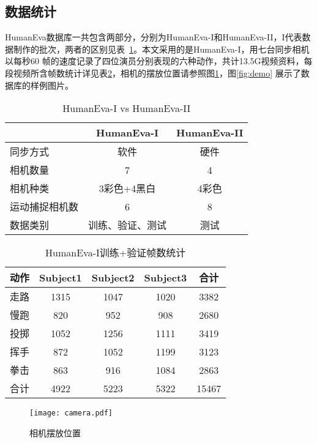 \subsection{数据统计}
HumanEva数据库一共包含两部分，分别为HumanEva-I和HumanEva-II，I代表数据制作的批次，两者的区别见表~\ref{tab:I-II}。本文采用的是HumanEva-I，用七台同步相机以每秒60 帧的速度记录了四位演员分别表现的六种动作，共计13.5G视频资料，每段视频所含帧数统计详见表\ref{tab:totalframes}，相机的摆放位置请参照图\ref{fig:camera}，图\ref{fig:demo} 展示了数据库的样例图片。
\begin{table}[htbp]
  \centering
  \caption{HumanEva-I vs HumanEva-II}
  \label{tab:I-II}
    \begin{tabular}{lcc}
      \toprule[1.5pt]
       & HumanEva-I & HumanEva-II \\\midrule[1pt]
      同步方式 & 软件 & 硬件\\
      相机数量 & 7 & 4\\
      相机种类 & 3彩色+4黑白 & 4彩色\\
      运动捕捉相机数 & 6 & 8\\
      数据类别 & 训练、验证、测试 & 测试\\
      \bottomrule[1.5pt]
    \end{tabular}
\end{table}

\begin{table}[htbp]
  \centering
  \caption{HumanEva-I训练+验证帧数统计}
  \label{tab:totalframes}
    \begin{tabular}{lcccc}
      \toprule[1.5pt]
      动作 & Subject1 & Subject2 & Subject3 & 合计 \\\midrule[1pt]
      走路 & 1315 & 1047 & 1020 & 3382 \\
      慢跑 & 820 & 952 & 908 & 2680 \\
      投掷 & 1052 & 1256 & 1111 & 3419 \\
      挥手 & 872 & 1052 & 1199 & 3123 \\
      拳击 & 863 & 916 & 1084 & 2863 \\
      合计 & 4922 & 5223 & 5322 & 15467\\
      \bottomrule[1.5pt]
    \end{tabular}
\end{table}

\begin{figure}[htbp]
  \centering
  \texttt{[image: camera.pdf]}\\
  \caption{相机摆放位置}\label{fig:camera}
\end{figure}

